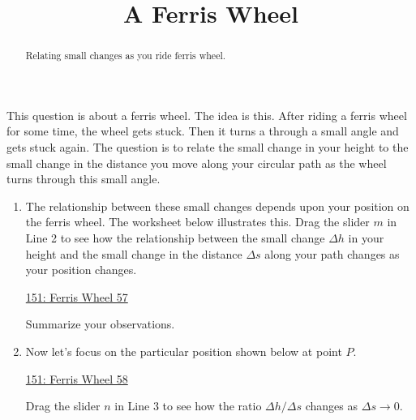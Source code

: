 \documentclass{ximera}
\title{A Ferris Wheel}
\begin{document}
\begin{abstract}
Relating small changes as you ride ferris wheel.
\end{abstract}
\maketitle




\begin{question}  \label{Qererfeft4tr4}

This question is about a ferris wheel. The idea is this. After riding a ferris wheel for some time, the wheel gets stuck. Then it turns a through a small angle and gets stuck again. The question is to relate the small change in your height to the small change in the distance you move along your circular path as the wheel turns through this small angle.


\begin{enumerate}
\item The relationship between these small changes depends upon your position on the ferris wheel. The worksheet below illustrates this. Drag the slider $m$ in Line 2 to see how the relationship between the small change $\Delta h$ in your height and the small change in the distance $\Delta s$ along your path changes as your position changes.

\begin{onlineOnly}
    \begin{center}
\end{center}
\end{onlineOnly}

\href{https://www.desmos.com/calculator/vc1xpi5mbq}{151: Ferris Wheel 57}

Summarize your observations.
\begin{freeResponse}
\end{freeResponse}

\item Now let's focus on the particular position shown below at point $P$.

\begin{onlineOnly}
    \begin{center}
\end{center}
\end{onlineOnly}

\href{https://www.desmos.com/calculator/9hlj4pkhni}{151: Ferris Wheel 58}

Drag the slider $n$ in Line 3 to see how the ratio $\Delta h/\Delta s$ changes as $\Delta s \to 0$. 


\end{enumerate}
\end{question}
\end{document}

